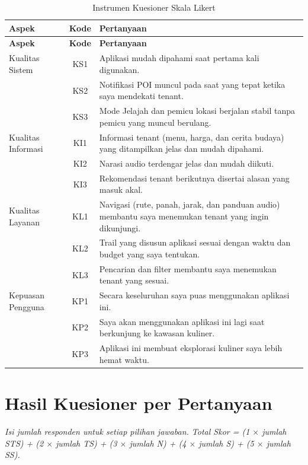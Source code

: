 \begin{longtable}{|L{0.22}|C{0.10}|L{0.68}|}
\caption{Instrumen Kuesioner Skala Likert}\\
\hline
{}\textbf{Aspek} & \textbf{Kode} & \textbf{Pertanyaan} \\ \hline
\endfirsthead
\hline
{}\textbf{Aspek} & \textbf{Kode} & \textbf{Pertanyaan} \\ \hline
\endhead
Kualitas Sistem & KS1 & Aplikasi mudah dipahami saat pertama kali digunakan. \\ \hline
 & KS2 & Notifikasi POI muncul pada saat yang tepat ketika saya mendekati tenant. \\ \hline
 & KS3 & Mode Jelajah dan pemicu lokasi berjalan stabil tanpa pemicu yang muncul berulang. \\ \hline
Kualitas Informasi & KI1 & Informasi tenant (menu, harga, dan cerita budaya) yang ditampilkan jelas dan mudah dipahami. \\ \hline
 & KI2 & Narasi audio terdengar jelas dan mudah diikuti. \\ \hline
 & KI3 & Rekomendasi tenant berikutnya disertai alasan yang masuk akal. \\ \hline
Kualitas Layanan & KL1 & Navigasi (rute, panah, jarak, dan panduan audio) membantu saya menemukan tenant yang ingin dikunjungi. \\ \hline
 & KL2 & Trail yang disusun aplikasi sesuai dengan waktu dan budget yang saya tentukan. \\ \hline
 & KL3 & Pencarian dan filter membantu saya menemukan tenant yang sesuai. \\ \hline
Kepuasan Pengguna & KP1 & Secara keseluruhan saya puas menggunakan aplikasi ini. \\ \hline
 & KP2 & Saya akan menggunakan aplikasi ini lagi saat berkunjung ke kawasan kuliner. \\ \hline
 & KP3 & Aplikasi ini membuat eksplorasi kuliner saya lebih hemat waktu. \\ \hline
\end{longtable}

\section{Hasil Kuesioner per Pertanyaan}

\textit{Isi jumlah responden untuk setiap pilihan jawaban. Total Skor = (1 \(\times\) jumlah STS) + (2 \(\times\) jumlah TS) + (3 \(\times\) jumlah N) + (4 \(\times\) jumlah S) + (5 \(\times\) jumlah SS).}

